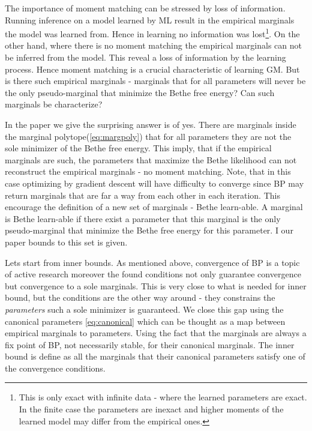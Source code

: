 {The importance of moment matching can be stressed by loss of information.
Running inference on a model learned by ML result in the empirical marginals the model was learned from. 
Hence in learning no information was lost\footnote{This is only exact with infinite data - where the learned parameters are exact. In the finite case the parameters are inexact and higher moments of the learned model may differ from the empirical ones.}.
On the other hand, where there is no moment matching the empirical marginals can not be inferred from the model.
 This reveal a loss of information by the learning process.
Hence moment matching is a crucial characteristic of learning GM.
But is there such empirical marginals - marginals that for all parameters will never be the only pseudo-marginal that minimize the Bethe free energy?
Can such marginals be characterize?

In the paper \cite{heinemann2012cannot} we give the surprising answer is of yes.
There are marginals inside the marginal polytope(\eqref{eq:margpoly}) that for all parameters they are not the sole minimizer of the Bethe free energy.
This imply, that if the empirical marginals are such, the parameters that maximize the Bethe likelihood can not reconstruct the empirical marginals - no moment matching.
Note, that in this case optimizing by gradient descent will have difficulty to converge since BP may return marginals that are far a way from each other in each iteration.
This encourage the definition of a new set of marginals - Bethe learn-able.
A marginal is Bethe learn-able if there exist a parameter that this marginal is the only pseudo-marginal that minimize the Bethe free energy for this parameter.
I our paper bounds to this set is given.

Lets start from inner bounds.
As mentioned above, convergence of BP is a topic of active research moreover the found conditions not only guarantee convergence but convergence to a sole marginals.
This is very close to what is needed for inner bound, but the conditions are the other way around - they constrains the \textit{parameters} such a sole minimizer is guaranteed.
We close this gap using the canonical parameters \eqref{eq:canonical} which can be thought as a map between empirical marginals to parameters.
Using the fact that the marginals are always a fix point of BP, not necessarily stable, for their canonical marginals.
The inner bound is define as all the marginals that their canonical parameters satisfy one of the convergence conditions.

}
